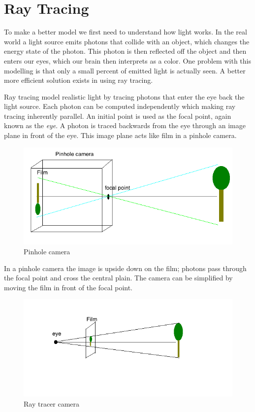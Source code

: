 \section{Ray Tracing}

To make a better model we first need to understand how light works.  In the real world a light source emits photons that collide with an object, which changes the energy state of the photon.  This photon is then reflected off the object and then enters our eyes, which our brain then interprets as a color.  One problem with this modelling is that only a small percent of emitted light is actually seen.  A better more efficient solution exists in using ray tracing.  

Ray tracing model realistic light by tracing photons that enter the eye back the light source.  Each photon can be computed independently which making ray tracing inherently parallel.  An initial point is used as the focal point, again known as the \textit{eye}.  A photon is traced backwards from the eye through an image plane in front of the eye.  This image plane acts like film in a pinhole camera.  

\begin{figure}[H]
\begin{center}
\includegraphics[scale=0.6]{pineholecamera.png} 
\caption{Pinhole camera}
\label{pinhole-camera}
\end{center}
\end{figure}

In a pinhole camera the image is upside down on the film; photons pass through the focal point and cross the central plain.  The camera can be simplified by moving the film in front of the focal point.

 \begin{figure}[H]
 \begin{center}
\includegraphics[scale=0.6]{raycamera.png} 
\caption{Ray tracer camera}
\label{ray-camera}
\end{center}
\end{figure}


